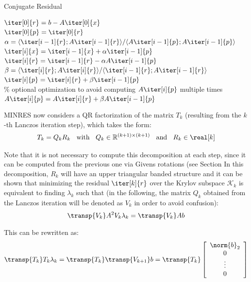 \begin{algorithm}[h]
  \caption{Conjugate Residual}
  \label{alg:conjugate_residual}
  \SetAlgoLined
  \DontPrintSemicolon
  $\iter[0]{r} = b-A\iter[0]{x}$ \\
  $\iter[0]{p} = \iter[0]{r}$ \\
   {
    $\alpha = \langle \iter[i-1]{r};A\iter[i-1]{r} \rangle / \langle A\iter[i-1]{p};A\iter[i-1]{p} \rangle$ \\
    $\iter[i]{x} = \iter[i-1]{x}+\alpha \iter[i-1]{p}$ \\
    $\iter[i]{r} = \iter[i-1]{r} - \alpha A\iter[i-1]{p}$ \\
    $\beta = \langle \iter[i]{r};A\iter[i]{r} \rangle / \langle \iter[i-1]{r};A\iter[i-1]{r} \rangle$ \\
    $\iter[i]{p} = \iter[i]{r} + \beta \iter[i-1]{p}$ \\
    \% optional optimization to avoid computing $A\iter[i]{p}$ multiple times \\
    $A\iter[i]{p} = A\iter[i]{r}+\beta A\iter[i-1]{p}$
  }
\end{algorithm}

MINRES now considers a QR factorization of the matrix $T_k$ (resulting from the $k$-th Lanczos iteration step), which takes the form:
\begin{equation}
    T_k= Q_k R_k \;\; \text{ with } \;\; Q_k \in \mathbb{R}^{(k+1)\times (k+1)}\;\; \text{ and } \;\; R_k \in \real[k]
\end{equation}

\noindent Note that it is not necessary to compute this decomposition at each step, since it can be computed from the previous one via Givens rotations (see Section %
In this decomposition, $R_k$ will have an upper triangular banded structure and it can be shown that minimizing the residual $\iter[k]{r}$ over the Krylov subspace $\mathcal{K}_k$ is equivalent to finding $\lambda_k$ such that (in the following, the matrix $Q_k$ obtained from the Lanczos iteration will be denoted as $V_k$ in order to avoid confusion):
\begin{equation}
    \transp{V_k}A^2V_k\lambda_k = \transp{V_k}Ab
\end{equation}

\noindent This can be rewritten as:
\begin{equation}
    \transp{T_k}T_k\lambda_k=\transp{T_k}\transp{V_{k+1}}b = \transp{T_k}\left[
        \begin{array}{c}
      \norm{b}_2 \\
       0 \\
      \vdots \\
      0 \\
    \end{array}\right]
\end{equation}

